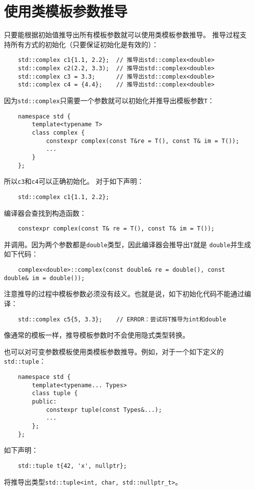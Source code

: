 \section{使用类模板参数推导}
只要能根据初始值推导出所有模板参数就可以使用类模板参数推导。
推导过程支持所有方式的初始化（只要保证初始化是有效的）：
\begin{lstlisting}
    std::complex c1{1.1, 2.2};  // 推导出std::complex<double>
    std::complex c2(2.2, 3.3);  // 推导出std::complex<double>
    std::complex c3 = 3.3;      // 推导出std::complex<double>
    std::complex c4 = {4.4};    // 推导出std::complex<double>
\end{lstlisting}
因为\texttt{std::complex}只需要一个参数就可以初始化并推导出模板参数\texttt{T}：
\begin{lstlisting}
    namespace std {
        template<typename T>
        class complex {
            constexpr complex(const T&re = T(), const T& im = T());
            ...
        }
    };
\end{lstlisting}
所以\texttt{c3}和\texttt{c4}可以正确初始化。
对于如下声明：
\begin{lstlisting}
    std::complex c1{1.1, 2.2};
\end{lstlisting}
编译器会查找到构造函数：
\begin{lstlisting}
    constexpr complex(const T& re = T(), const T& im = T());
\end{lstlisting}
并调用。因为两个参数都是\texttt{double}类型，因此编译器会推导出\texttt{T}就是
\texttt{double}并生成如下代码：
\begin{lstlisting}
    complex<double>::complex(const double& re = double(), const double& im = double());
\end{lstlisting}
注意推导的过程中模板参数必须没有歧义。也就是说，如下初始化代码不能通过编译：
\begin{lstlisting}
    std::complex c5{5, 3.3};    // ERROR：尝试将T推导为int和double
\end{lstlisting}
像通常的模板一样，推导模板参数时不会使用隐式类型转换。

也可以对可变参数模板使用类模板参数推导。例如，对于一个如下定义的\texttt{std::tuple}：
\begin{lstlisting}
    namespace std {
        template<typename... Types>
        class tuple {
        public:
            constexpr tuple(const Types&...);
            ...
        };
    };
\end{lstlisting}
如下声明：
\begin{lstlisting}
    std::tuple t{42, 'x', nullptr};
\end{lstlisting}
将推导出类型\texttt{std::tuple<int, char, std::nullptr\_t>}。

